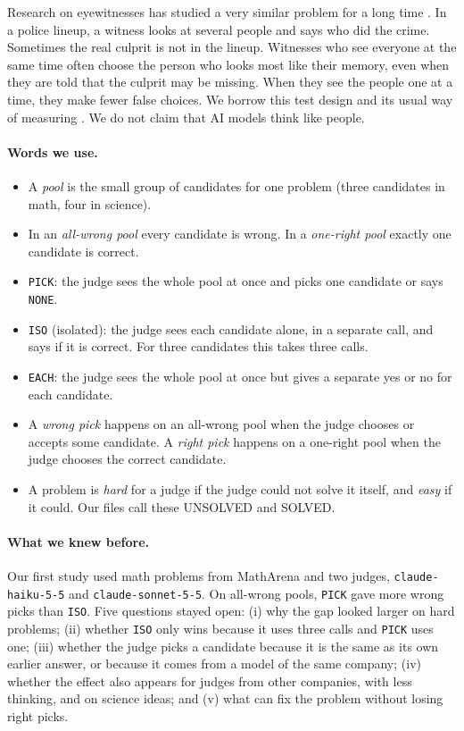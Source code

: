 \documentclass[10pt,twocolumn]{article}
\begin{document}
Research on eyewitnesses has studied a very similar problem for a long time \citep{wells1984psychology,malpass1981eyewitness,steblay2001eyewitness,steblay2011seventytwo}. In a police lineup, a witness looks at several people and says who did the crime. Sometimes the real culprit is not in the lineup. Witnesses who see everyone at the same time often choose the person who looks most like their memory, even when they are told that the culprit may be missing. When they see the people one at a time, they make fewer false choices. We borrow this test design and its usual way of measuring \citep{wixted2012field}. We do not claim that AI models think like people.

\paragraph{Words we use.}
\begin{itemize}\setlength{\itemsep}{1pt}
\item A \emph{pool} is the small group of candidates for one problem (three candidates in math, four in science).
\item In an \emph{all-wrong pool} every candidate is wrong. In a \emph{one-right pool} exactly one candidate is correct.
\item \texttt{PICK}: the judge sees the whole pool at once and picks one candidate or says \texttt{NONE}.
\item \texttt{ISO} (isolated): the judge sees each candidate alone, in a separate call, and says if it is correct. For three candidates this takes three calls.
\item \texttt{EACH}: the judge sees the whole pool at once but gives a separate yes or no for each candidate.
\item A \emph{wrong pick} happens on an all-wrong pool when the judge chooses or accepts some candidate. A \emph{right pick} happens on a one-right pool when the judge chooses the correct candidate.
\item A problem is \emph{hard} for a judge if the judge could not solve it itself, and \emph{easy} if it could. Our files call these UNSOLVED and SOLVED.
\end{itemize}

\paragraph{What we knew before.}
Our first study \citep[v1;][]{sharma2026nocandidate} used math problems from MathArena \citep{balunovic2025matharena} and two judges, \texttt{claude-haiku-5-5} and \texttt{claude-sonnet-5-5}. On all-wrong pools, \texttt{PICK} gave more wrong picks than \texttt{ISO}. Five questions stayed open: (i) why the gap looked larger on hard problems; (ii) whether \texttt{ISO} only wins because it uses three calls and \texttt{PICK} uses one; (iii) whether the judge picks a candidate because it is the same as its own earlier answer, or because it comes from a model of the same company; (iv) whether the effect also appears for judges from other companies, with less thinking, and on science ideas; and (v) what can fix the problem without losing right picks.
\end{document}
